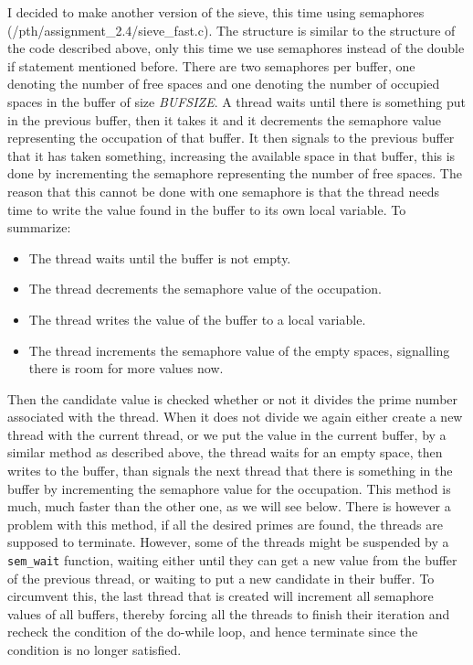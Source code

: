 \documentclass[11pt,a4paper,onecolumn]{article}
\begin{document}
I decided to make another version of the sieve, this time using semaphores (/pth/assignment\_2.4/sieve\_fast.c). The structure is similar to the structure of the code described above, only this time we use semaphores instead of the double if statement mentioned before. There are two semaphores per buffer, one denoting the number of free spaces and one denoting the number of occupied spaces in the buffer of size \emph{BUFSIZE}. A thread waits until there is something put in the previous buffer, then it takes it and it decrements the semaphore value representing the occupation of that buffer. It then signals to the previous buffer that it has taken something, increasing the available space in that buffer, this is done by incrementing the semaphore representing the number of free spaces. The reason that this cannot be done with one semaphore is that the thread needs time to write the value found in the buffer to its own local variable. To summarize:
\begin{itemize}
\item 
  The thread waits until the buffer is not empty.
\item
  The thread decrements the semaphore value of the occupation.
\item
  The thread writes the value of the buffer to a local variable.
\item
  The thread increments the semaphore value of the empty spaces, signalling there is room for more values now.
\end{itemize}
Then the candidate value is checked whether or not it divides the prime number associated with the thread. When it does not divide we again either create a new thread with the current thread, or we put the value in the current buffer, by a similar method as described above, the thread waits for an empty space, then writes to the buffer, than signals the next thread that there is something in the buffer by incrementing the semaphore value for the occupation.
This method is much, much faster than the other one, as we will see below. There is however a problem with this method, if all the desired primes are found, the threads are supposed to terminate. However, some of the threads might be suspended by a \texttt{sem\_wait} function, waiting either until they can get a new value from the buffer of the previous thread, or waiting to put a new candidate in their buffer. To circumvent this, the last thread that is created will increment all semaphore values of all buffers, thereby forcing all the threads to finish their iteration and recheck the condition of the do-while loop, and hence terminate since the condition is no longer satisfied.
\end{document}
